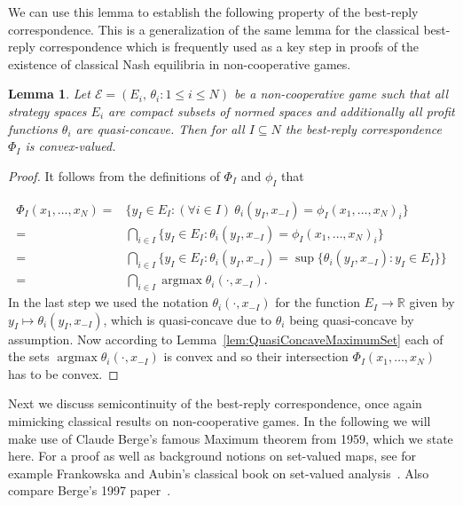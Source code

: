 \documentclass[a4paper,11pt,reqno,english]{amsart}
\theoremstyle{plain}
\newtheorem{lemma}[theorem]{Lemma}
\theoremstyle{definition}
\newcommand{\Ecal}{\mathcal{E}}
\begin{document}
We can use this lemma to establish the following property of the best-reply correspondence.
This is a generalization of the same lemma for the classical best-reply correspondence which is frequently used as a key step in proofs of the existence of classical Nash equilibria in non-cooperative games.

\begin{lemma}\label{lem:MultilateralBestReplyConvex}
	Let $\Ecal=(E_i,\,\theta_i : 1\leq i\leq N)$  be a non-cooperative game such that all strategy spaces $E_i$ are compact subsets of normed spaces and additionally all profit functions $\theta_i$ are quasi-concave.
	Then for all $I\subseteq N$ the best-reply correspondence $\Phi_I$ is convex-valued.
\end{lemma}
\begin{proof}
	It follows from the definitions of $\Phi_I$ and $\phi_I$ that

	\begin{align*}
		\Phi_I(x_1,\dots,x_N) = & \big\{y_I\in E_I : (\forall i\in I) \ \theta_i(y_I, x_{-I}) = \phi_I(x_1,\dots,x_N)_i\big\}                \\
		=                       & \bigcap_{i\in I}\big\{y_I\in E_I : \theta_i(y_I, x_{-I}) = \phi_I(x_1,\dots,x_N)_i\big\}                   \\
		=                       & \bigcap_{i\in I}\big\{y_I\in E_I : \theta_i(y_I, x_{-I}) = \sup\{\theta_i(y_I,x_{-I}) : y_I\in E_I\}\big\} \\
		=                       & \bigcap_{i\in I}  \operatorname{argmax} \theta_i(\cdot,x_{-I}) .
	\end{align*}
	In the last step we used the notation $\theta_i(\cdot,x_{-I})$ for the function $E_I\longrightarrow \mathbb{R}$ given by $y_I\longmapsto \theta_i(y_I,x_{-I})$, which is quasi-concave due to $\theta_i$ being quasi-concave by assumption.
	Now according to Lemma~\ref{lem:QuasiConcaveMaximumSet} each of the sets $\operatorname{argmax}\theta_i(\cdot,x_{-I})$ is convex and so their intersection $\Phi_I(x_1,\dots,x_N)$ has to be convex.
\end{proof}

\medskip
Next we discuss semicontinuity of the best-reply correspondence, once again mimicking classical results on non-cooperative games.
In the following we will make use of Claude Berge's famous Maximum theorem from 1959, which we state here.
For a proof as well as background notions on set-valued maps, see for example Frankowska and Aubin's classical book on set-valued analysis~\cite[Thm.\,17.31]{Aubin_Frankowska_2009}.
Also compare Berge's 1997 paper~\cite[Ch.VI.3,\,Thm.\,1]{Berge1997}.
\end{document}
